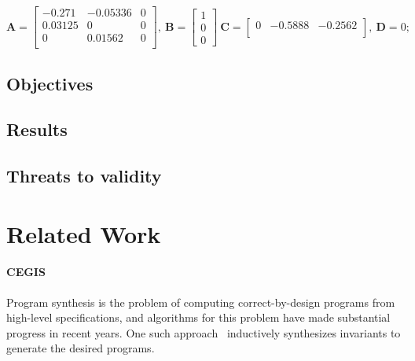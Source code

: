 \documentclass[runningheads,a4paper]{llncs}
\begin{document}
\begin{itemize}
{$$
\textbf{A}=\left[\begin{array}{ccc}
-0.271		& -0.05336	& 0	\\
0.03125		& 0			& 0			\\
0			& 0.01562 	& 0			\\	
\end{array}\right],~ \textbf{B} = \left[\begin{array}{c}
1 \\ 0 \\ 0
\end{array}\right]~
\textbf{C}=\left[\begin{array}{ccc}
0	& -0.5888	& -0.2562 \\
\end{array}\right],~ \textbf{D}= 0;
$$
}
\end{itemize}



\subsection{Objectives}

\subsection{Results}


\subsection{Threats to validity}


\section{Related Work}

\paragraph{CEGIS}

Program synthesis is the problem of computing correct-by-design programs
from high-level specifications, and algorithms for this problem have made
substantial progress in recent years.  One such
approach~\cite{itzhaky2010simple} inductively synthesizes invariants to
generate the desired programs.
\end{document}
